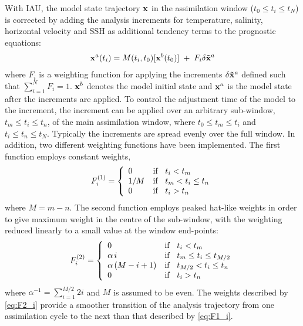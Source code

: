 \documentclass[../main/NEMO_manual]{subfiles}
\begin{document}
With IAU, the model state trajectory ${\bf x}$ in the assimilation window ($t_{0} \leq t_{i} \leq t_{N}$)
is corrected by adding the analysis increments for temperature, salinity, horizontal velocity and SSH as
additional tendency terms to the prognostic equations:
\begin{align*}
  {\bf x}^{a}(t_{i}) = M(t_{i}, t_{0})[{\bf x}^{b}(t_{0})] \; + \; F_{i} \delta \tilde{\bf x}^{a}
\end{align*}
where $F_{i}$ is a weighting function for applying the increments $\delta\tilde{\bf x}^{a}$ defined such that
$\sum_{i=1}^{N} F_{i}=1$.
${\bf x}^b$ denotes the model initial state and ${\bf x}^a$ is the model state after the increments are applied.
To control the adjustment time of the model to the increment,
the increment can be applied over an arbitrary sub-window, $t_{m} \leq t_{i} \leq t_{n}$,
of the main assimilation window, where $t_{0} \leq t_{m} \leq t_{i}$ and $t_{i} \leq t_{n} \leq t_{N}$.
Typically the increments are spread evenly over the full window.
In addition, two different weighting functions have been implemented.
The first function employs constant weights, 
\begin{align}
  \label{eq:F1_i}
  F^{(1)}_{i}
  =\left\{
  \begin{array}{ll}
    0     &    {\rm if} \; \; \; t_{i} < t_{m}                \\
    1/M &    {\rm if} \; \; \; t_{m} < t_{i} \leq t_{n} \\
    0     &    {\rm if} \; \; \; t_{i} > t_{n}
  \end{array}
            \right. 
\end{align}
where $M = m-n$.
The second function employs peaked hat-like weights in order to give maximum weight in the centre of the sub-window,
with the weighting reduced linearly to a small value at the window end-points:
\begin{align}
  \label{eq:F2_i}
  F^{(2)}_{i}
  =\left\{
  \begin{array}{ll}
    0                           &    {\rm if} \; \; \; t_{i}       <     t_{m}                        \\
    \alpha \, i               &    {\rm if} \; \; \; t_{m}    \leq t_{i}    \leq   t_{M/2}   \\
    \alpha \, (M - i +1) &    {\rm if} \; \; \; t_{M/2}  <    t_{i}    \leq   t_{n}       \\
    0                            &   {\rm if} \; \; \; t_{i}        >    t_{n}
  \end{array}
                                   \right.
\end{align}
where $\alpha^{-1} = \sum_{i=1}^{M/2} 2i$ and $M$ is assumed to be even. 
The weights described by \autoref{eq:F2_i} provide a smoother transition of the analysis trajectory from
one assimilation cycle to the next than that described by \autoref{eq:F1_i}.
\end{document}
